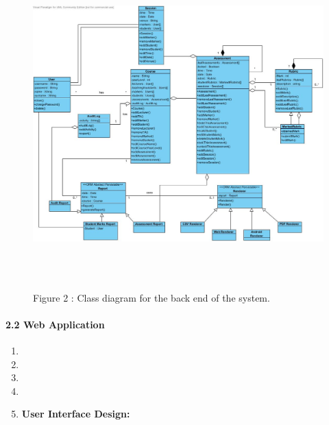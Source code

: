 \documentclass{article}
\begin{document}
\begin{figure}[ht!]
     	\centering
       	\includegraphics[width=5in, height=5in]{./Diagrams/2.1.3/BackEndClassDiagrams.jpg}
       Figure 2 : Class diagram for the back end of the system.
\end{figure}

     

     

     

     

     

 


\paragraph{2.2  Web Application}

\noindent 

\begin{enumerate}
\item  

\item  

\item  

\item  

\item  \textbf{User Interface Design:}
\end{enumerate}
\end{document}
